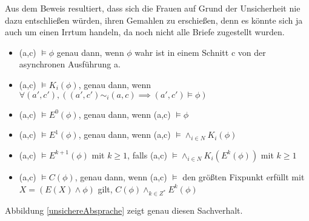 Aus dem Beweis resultiert, dass sich die Frauen auf Grund der Unsicherheit nie dazu entschließen würden, ihren Gemahlen zu erschießen, denn es könnte sich ja auch um einen Irrtum handeln, da noch nicht alle Briefe zugestellt wurden.
\begin{definition}
\begin{itemize}
\item (a,c) $\vDash \phi$ genau dann, wenn $\phi$ wahr ist in einem Schnitt c von der asynchronen Ausführung a.
\item (a,c) $\vDash K_i(\phi)$, genau dann, wenn 
$\forall(a',c'), ((a',c') \sim_i (a,c) \implies (a',c') \vDash \phi)$
\item (a,c) $\vDash E^0(\phi)$, genau dann, wenn (a,c) $\vDash \phi$
\item (a,c) $\vDash E^1(\phi)$, genau dann, wenn (a,c) $\vDash\land_{i\in N}K_i(\phi)$
\item (a,c) $\vDash E^{k+1}(\phi)$ mit $k\ge 1$, falls (a,c) $\vDash\land_{i\in N}K_i(E^k(\phi))$ mit $k\ge 1$
\item (a,c) $\vDash C(\phi)$, genau dann, wenn (a,c) $\vDash$ den größten Fixpunkt erfüllt mit $X=(E(X)\wedge \phi)$ gilt, $C(\phi) \land_{k\in Z^*}E^k(\phi)$
\end{itemize}
\end{definition}
Abbildung \ref{unsichereAbsprache} zeigt genau diesen Sachverhalt.

